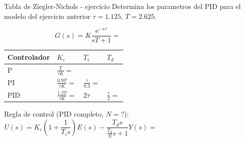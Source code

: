 \documentclass[presentation,aspectratio=1610]{beamer}
\begin{document}
\begin{frame}[label={sec:org6646720}]{Tabla de  Ziegler-Nichols - ejercicio}
Determina los parametros del PID para el modelo del ejercicio anterior \(\tau = 1.125\), \(T = 2.625\).

\[ G(s) = K \frac{\mathrm{e}^{-s\tau}}{sT + 1} =  \qquad\qquad\qquad\qquad\qquad\qquad \]
   \begin{center}
   \setlength{\tabcolsep}{20pt}
   \renewcommand{\arraystretch}{1.5}
   \begin{tabular}{llll}
   Controlador & \(K_c\) & \(T_i\) & \(T_d\)\\
  \hline\hline
  P & \(\frac{T}{\tau K} = \) &  & \\
  PI & \(\frac{0.9T}{\tau K} = \) & \(\frac{\tau}{0.3} = \) & \\
  PID & \(\frac{1.2T}{\tau K} = \) & \(2\tau\) & \(\frac{\tau}{2}=\)\\
  \hline
\end{tabular}
\end{center}
Regla de control (PID completo, \(N=?\)):
\[ U(s) = K_c\left( 1 + \frac{1}{T_i s} \right) E(s) - \frac{T_d s}{\frac{T_d}{N} s + 1}Y(s)
           =  \qquad\qquad\qquad\qquad\qquad\qquad\quad\quad\]
\end{frame}
\end{document}
